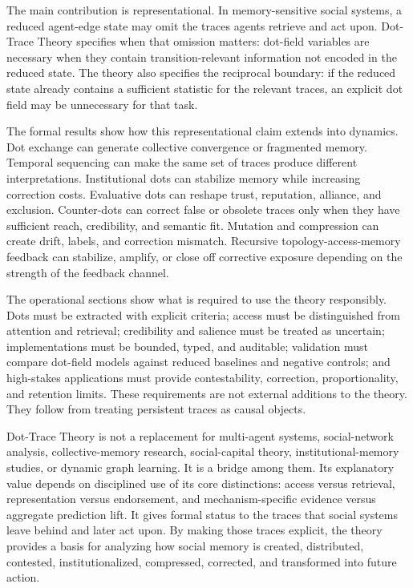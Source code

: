 \documentclass[11pt]{article}
\theoremstyle{remark}
\begin{document}
The main contribution is representational. In memory-sensitive social systems, a reduced agent-edge state may omit the traces agents retrieve and act upon. Dot-Trace Theory specifies when that omission matters: dot-field variables are necessary when they contain transition-relevant information not encoded in the reduced state. The theory also specifies the reciprocal boundary: if the reduced state already contains a sufficient statistic for the relevant traces, an explicit dot field may be unnecessary for that task.

The formal results show how this representational claim extends into dynamics. Dot exchange can generate collective convergence or fragmented memory. Temporal sequencing can make the same set of traces produce different interpretations. Institutional dots can stabilize memory while increasing correction costs. Evaluative dots can reshape trust, reputation, alliance, and exclusion. Counter-dots can correct false or obsolete traces only when they have sufficient reach, credibility, and semantic fit. Mutation and compression can create drift, labels, and correction mismatch. Recursive topology-access-memory feedback can stabilize, amplify, or close off corrective exposure depending on the strength of the feedback channel.

The operational sections show what is required to use the theory responsibly. Dots must be extracted with explicit criteria; access must be distinguished from attention and retrieval; credibility and salience must be treated as uncertain; implementations must be bounded, typed, and auditable; validation must compare dot-field models against reduced baselines and negative controls; and high-stakes applications must provide contestability, correction, proportionality, and retention limits. These requirements are not external additions to the theory. They follow from treating persistent traces as causal objects.

Dot-Trace Theory is not a replacement for multi-agent systems, social-network analysis, collective-memory research, social-capital theory, institutional-memory studies, or dynamic graph learning. It is a bridge among them. Its explanatory value depends on disciplined use of its core distinctions: access versus retrieval, representation versus endorsement, and mechanism-specific evidence versus aggregate prediction lift. It gives formal status to the traces that social systems leave behind and later act upon. By making those traces explicit, the theory provides a basis for analyzing how social memory is created, distributed, contested, institutionalized, compressed, corrected, and transformed into future action.
\end{document}
